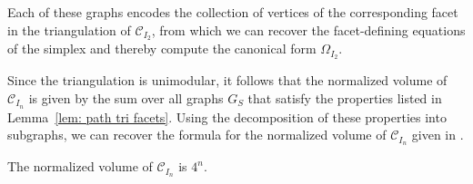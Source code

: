 \begin{example}
\begin{center}
        \medskip
        
        \end{center}

        Each of these graphs encodes the collection of vertices of the corresponding facet in the triangulation of $\mathcal{C}_{I_{2}}$, from which we can recover the facet-defining equations of the simplex and thereby compute the canonical form $\Omega_{I_2}$. 
\end{example}

Since the triangulation is unimodular, it follows that the normalized volume of $\mathcal{C}_{I_{n}}$ is given by the sum over all graphs $G_S$ that satisfy the properties listed in Lemma~\ref{lem: path tri facets}. 
Using the decomposition of these properties into subgraphs, we can recover the formula for the normalized volume of $\mathcal{C}_{I_{n}}$ given in \cite{kuhne2022faces}. 

\begin{coro}
\label{cor: volume path}
The normalized volume of $\mathcal{C}_{I_{n}}$ is $4^n$.
\end{coro}

